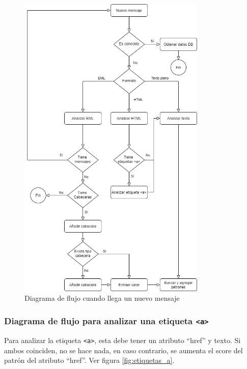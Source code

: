 \begin{figure}[htb]
    \centering
    \includegraphics[width=0.8\textwidth]{imagenes/DiagramasFlujo/NuevoMensaje.png}
\caption{Diagrama de flujo cuando llega un nuevo mensaje}
\label{fig:nuevoMensaje}
\end{figure}

\cprotect\subsubsection{Diagrama de flujo para analizar una etiqueta \verb!<a>!}

Para analizar la etiqueta \verb!<a>!, esta debe tener un atributo “href” y texto. Si ambos coinciden, no se hace nada, en caso contrario, se aumenta el score del patrón del atributo “href”. Ver figura \ref{fig:etiquetas_a}.

